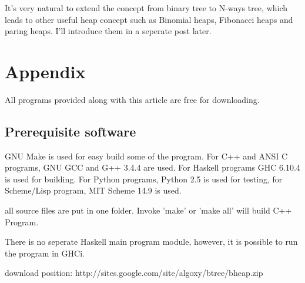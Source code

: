 \documentclass{article}
\begin{document}
It's very natural to extend the concept from binary tree to
N-ways tree, which leads to other useful heap concept such as
Binomial heaps, Fibonacci heaps and paring heaps. I'll introduce
them in a seperate post later.

\section{Appendix} \label{appendix}
All programs provided along with this article are free for
downloading.

\subsection{Prerequisite software}
GNU Make is used for easy build some of the program. For C++ and ANSI C programs,
GNU GCC and G++ 3.4.4 are used. 
For Haskell programs GHC 6.10.4 is used
for building. For Python programs, Python 2.5 is used for testing, for
Scheme/Lisp program, MIT Scheme 14.9 is used.

all source files are put in one folder. Invoke 'make' or 'make all'
will build C++ Program. 

There is no seperate Haskell main program module, however, it is possible to run the program in GHCi.

download position: http://sites.google.com/site/algoxy/btree/bheap.zip
\end{document}
